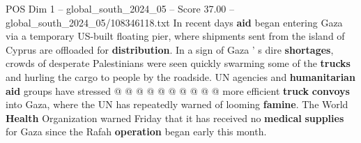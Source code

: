 \begin{textsample}{POS Dim 1 – global\_south\_2024\_05 – Score 37.00 – global\_south\_2024\_05/108346118.txt}
In recent days \textbf{aid} began entering Gaza via a temporary US-built floating pier, where shipments sent from the island of Cyprus are offloaded for \textbf{distribution}.
In a sign of Gaza ' s dire \textbf{shortages}, crowds of desperate Palestinians were seen quickly swarming some of the \textbf{trucks} and hurling the cargo to people by the roadside.
UN agencies and \textbf{humanitarian} \textbf{aid} groups have stressed @ @ @ @ @ @ @ @ @ @ more efficient \textbf{truck} \textbf{convoys} into Gaza, where the UN has repeatedly warned of looming \textbf{famine}.
The World \textbf{Health} Organization warned Friday that it has received no \textbf{medical} \textbf{supplies} for Gaza since the Rafah \textbf{operation} began early this month.

\end{textsample}
